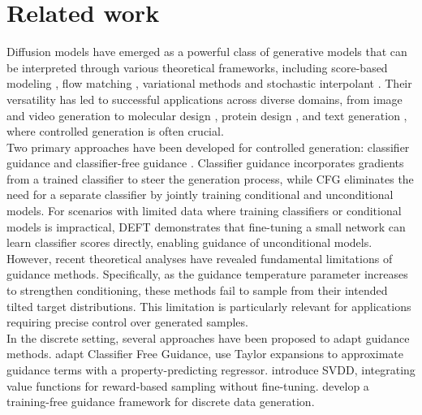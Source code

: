 \section{Related work}
Diffusion models have emerged as a powerful class of generative models that can be interpreted through various theoretical frameworks, including score-based modeling \citep{song2020generativemodelingestimatinggradients, song2021scorebasedgenerativemodelingstochastic}, flow matching \citep{lipman2023flowmatchinggenerativemodeling, lipman2024flowmatchingguidecode}, variational methods \citep{ho2020denoisingdiffusionprobabilisticmodels} and stochastic interpolant \citep{albergo2023buildingnormalizingflowsstochastic, albergo2023stochasticinterpolantsunifyingframework}. Their versatility has led to successful applications across diverse domains, from image and video generation \citep{rombach2022highresolutionimagesynthesislatent, podell2023sdxlimprovinglatentdiffusion, blattmann2023stablevideodiffusionscaling}  to molecular design \citep{cornet2024equivariant, vignac2023digress, hoogeboom2022equivariantdiffusionmoleculegeneration}, protein design \citep{watson2023novo}, and text generation \citep{diffusion-jiaxin, sedd, gulrajani2023likelihoodbaseddiffusionlanguagemodels}, where controlled generation is often crucial. \\
Two primary approaches have been developed for controlled generation: classifier guidance \citep{dhariwal2021diffusionmodelsbeatgans} and classifier-free guidance \citep{ho2022classifierfreediffusionguidance}. Classifier guidance incorporates gradients from a trained classifier to steer the generation process, while CFG eliminates the need for a separate classifier by jointly training conditional and unconditional models. For scenarios with limited data where training classifiers or conditional models is impractical, DEFT \citep{DEFT} demonstrates that fine-tuning a small network can learn classifier scores directly, enabling guidance of unconditional models.
However, recent theoretical analyses \citep{what-does-guidance-do, bradley2024classifierfreeguidancepredictorcorrector} have revealed fundamental limitations of guidance methods. Specifically, as the guidance temperature parameter increases to strengthen conditioning, these methods fail to sample from their intended tilted target distributions. This limitation is particularly relevant for applications requiring precise control over generated samples.\\
In the discrete setting, several approaches have been proposed to adapt guidance methods. \citet{unlock_guidance} adapt Classifier Free Guidance, \citet{vignac2023digress} use Taylor expansions to approximate guidance terms with a property-predicting regressor. \citet{li2024derivativefreeguidancecontinuousdiscrete} introduce SVDD, integrating value functions for reward-based sampling without fine-tuning. \citet{training-free-guidance} develop a training-free guidance framework for discrete data generation. \\
